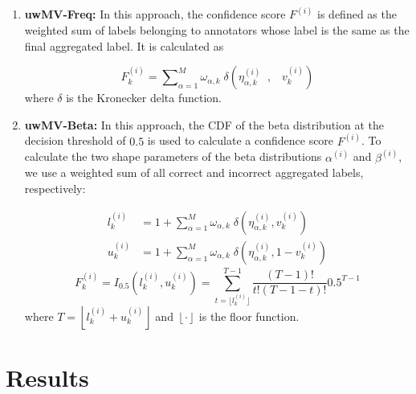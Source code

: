 \begin{enumerate}
    \item \textbf{uwMV-Freq:} In this approach, the confidence score $F^{(i)} $ is defined as the weighted sum of labels belonging to annotators whose label is the same as the final aggregated label. It is calculated as

    \begin{equation}
        F_k^{(i)}={\sum\nolimits_{\alpha=1}^{M}{\omega_{\alpha,k}\;\delta\left(\eta_{\alpha,k}^{(i)}\;\;,\;\;\;v_k^{(i)}\right)}}
        \label{eq:crowd.eq.13.confidence-score.freq}
    \end{equation}
    where $\delta $ is the Kronecker delta function.


    \item \textbf{uwMV-Beta:} In this approach, the CDF of the beta distribution at the decision threshold of $0.5 $ is used to calculate a confidence score $F^{(i)} $. To calculate the two shape parameters of the beta distributions $\alpha^{(i)} $ and $\beta^{(i)} $, we use a weighted sum of all correct and incorrect aggregated labels, respectively:

    \begin{equation}
        \begin{aligned}
            l_k^{(i)} &= 1 + \sum_{\alpha=1}^{M} \omega_{\alpha,k} \; \delta\left(\eta_{\alpha,k}^{(i)}, v_{k}^{(i)}\right) \\
            u_k^{(i)} &= 1 + \sum_{\alpha=1}^{M} \omega_{\alpha,k} \; \delta\left(\eta_{\alpha,k}^{(i)}, 1 - v_{k}^{(i)}\right)
        \end{aligned}
        \label{eq:crowd.eq.14.beta_l_u}
    \end{equation}
    \begin{equation}
        F_k^{(i)}=I_{0.5}\left(l_k^{(i)},u_k^{(i)}\right)=\sum_{t=\lfloor l_k^{(i)}\rfloor}^{T-1}\frac{(T-1)!}{t!(T-1-t)!}0.5^{T-1}
        \label{eq:crowd.eq.15.confidence-score.beta}
    \end{equation}
    where $T=\left\lfloor l_k^{(i)} + u_k^{(i)}\right\rfloor $ and $\left\lfloor\cdot\right\rfloor $ is the floor function.

\end{enumerate}



\section{Results}

